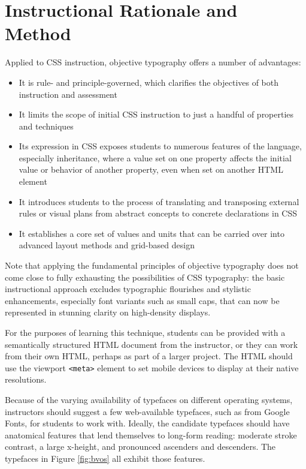 \documentclass[sigplan,screen]{acmart}
\begin{document}
\section{Instructional Rationale and Method}

Applied to CSS instruction, objective typography offers a number of advantages:

\begin{itemize}
  \item It is rule- and principle-governed, which clarifies the objectives of both instruction and assessment
  \item It limits the scope of initial CSS instruction to just a handful of properties and techniques
  \item Its expression in CSS exposes students to numerous features of the language, especially inheritance, where a value set on one property affects the initial value or behavior of another property, even when set on another HTML element
  \item It introduces students to the process of translating and transposing external rules or visual plans from abstract concepts to concrete declarations in CSS
  \item It establishes a core set of values and units that can be carried over into advanced layout methods and grid-based design
\end{itemize}

Note that applying the fundamental principles of objective typography does not come close to fully exhausting the possibilities of CSS typography: the basic instructional approach excludes typographic flourishes and stylistic enhancements, especially font variants such as small caps, that can now be represented in stunning clarity on high-density displays.

For the purposes of learning this technique, students can be provided with a semantically structured HTML document from the instructor, or they can work from their own HTML, perhaps as part of a larger project. The HTML should use the viewport \verb|<meta>| element to set mobile devices to display at their native resolutions.

Because of the varying availability of typefaces on different operating systems, instructors should suggest a few web-available typefaces, such as from Google Fonts, for students to work with. Ideally, the candidate typefaces should have anatomical features that lend themselves to long-form reading: moderate stroke contrast, a large x-height, and pronounced ascenders and descenders. The typefaces in Figure \ref{fig:bvos} all exhibit those features.
\end{document}
